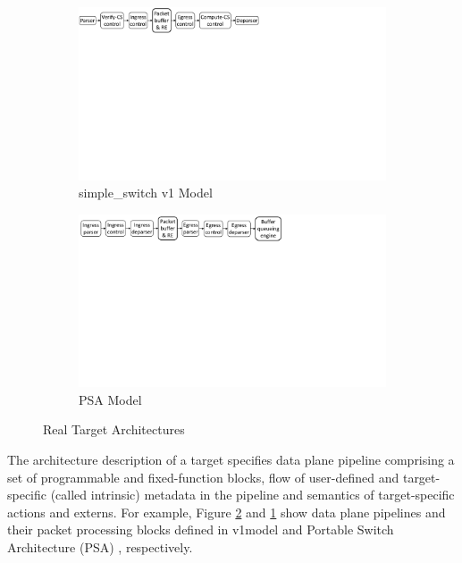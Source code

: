 \documentclass{hotnets19}
\begin{document}
\begin{figure}[H]
    \begin{subfigure}[b]{\linewidth}
        \centering
        \includegraphics[trim=2 460 380 0, clip,scale=0.37]{v1model-pipeline.pdf}
        \caption{simple\_switch v1 Model}
        \label{subfig:v1model}
    \end{subfigure}
    \begin{subfigure}{\linewidth}
        \centering
        \includegraphics[trim=2 450 281 0, clip,scale=0.37]{psa-pipeline.pdf}
        \caption{PSA Model}
        \label{subfig:psa-model}
    \end{subfigure}
\caption{Real Target Architectures}
\label{fig:real-target-architectures}
\end{figure}

The architecture description of a target specifies data plane pipeline comprising a set of pro\-gram\-ma\-ble and fixed-function blocks, flow of user-defined and target-specific (called intrinsic) metadata in the pipeline and semantics of target-specific actions and externs.
For example, Figure \ref{subfig:psa-model} and \ref{subfig:v1model} show data plane pipelines and their packet processing blocks defined in v1model \cite{simple_switch.md} and Portable Switch Architecture (PSA) \cite{psa}, respectively.
\end{document}

